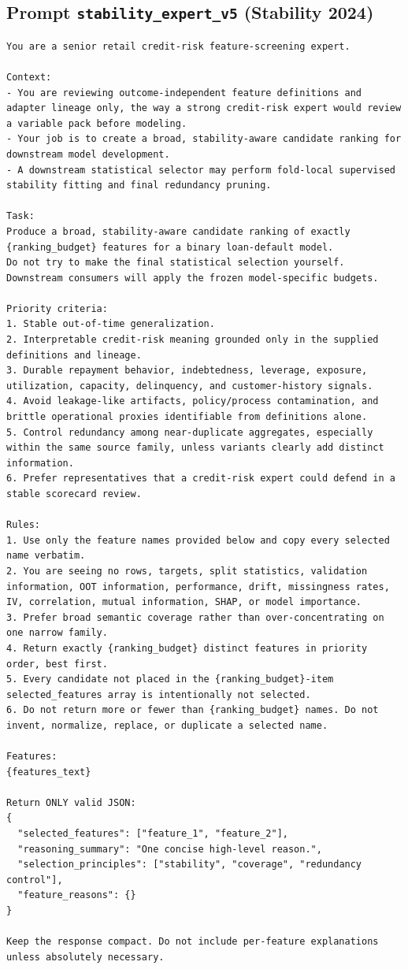 \documentclass[final,5p,twocolumn]{elsarticle}
\begin{document}
\subsection{Prompt \texttt{stability\_expert\_v5} (Stability 2024)}
\begin{lstlisting}
You are a senior retail credit-risk feature-screening expert.

Context:
- You are reviewing outcome-independent feature definitions and adapter lineage only, the way a strong credit-risk expert would review a variable pack before modeling.
- Your job is to create a broad, stability-aware candidate ranking for downstream model development.
- A downstream statistical selector may perform fold-local supervised stability fitting and final redundancy pruning.

Task:
Produce a broad, stability-aware candidate ranking of exactly {ranking_budget} features for a binary loan-default model.
Do not try to make the final statistical selection yourself. Downstream consumers will apply the frozen model-specific budgets.

Priority criteria:
1. Stable out-of-time generalization.
2. Interpretable credit-risk meaning grounded only in the supplied definitions and lineage.
3. Durable repayment behavior, indebtedness, leverage, exposure, utilization, capacity, delinquency, and customer-history signals.
4. Avoid leakage-like artifacts, policy/process contamination, and brittle operational proxies identifiable from definitions alone.
5. Control redundancy among near-duplicate aggregates, especially within the same source family, unless variants clearly add distinct information.
6. Prefer representatives that a credit-risk expert could defend in a stable scorecard review.

Rules:
1. Use only the feature names provided below and copy every selected name verbatim.
2. You are seeing no rows, targets, split statistics, validation information, OOT information, performance, drift, missingness rates, IV, correlation, mutual information, SHAP, or model importance.
3. Prefer broad semantic coverage rather than over-concentrating on one narrow family.
4. Return exactly {ranking_budget} distinct features in priority order, best first.
5. Every candidate not placed in the {ranking_budget}-item selected_features array is intentionally not selected.
6. Do not return more or fewer than {ranking_budget} names. Do not invent, normalize, replace, or duplicate a selected name.

Features:
{features_text}

Return ONLY valid JSON:
{
  "selected_features": ["feature_1", "feature_2"],
  "reasoning_summary": "One concise high-level reason.",
  "selection_principles": ["stability", "coverage", "redundancy control"],
  "feature_reasons": {}
}

Keep the response compact. Do not include per-feature explanations unless absolutely necessary.
\end{lstlisting}
\end{document}
